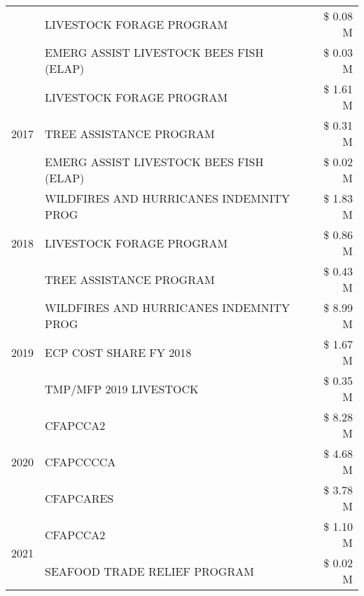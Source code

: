 \begin{tabular}{llr}
 & LIVESTOCK FORAGE PROGRAM                      & \$ 0.08 M \\
 & EMERG ASSIST LIVESTOCK BEES FISH (ELAP)       & \$ 0.03 M \\
\cline{1-3}
\multirow[t]{3}{*}{2017} & LIVESTOCK FORAGE PROGRAM & \$ 1.61 M \\
 & TREE ASSISTANCE PROGRAM & \$ 0.31 M \\
 & EMERG ASSIST LIVESTOCK BEES FISH (ELAP) & \$ 0.02 M \\
\cline{1-3}
\multirow[t]{3}{*}{2018} & WILDFIRES AND HURRICANES INDEMNITY PROG & \$ 1.83 M \\
 & LIVESTOCK FORAGE PROGRAM & \$ 0.86 M \\
 & TREE ASSISTANCE PROGRAM & \$ 0.43 M \\
\cline{1-3}
\multirow[t]{3}{*}{2019} & WILDFIRES AND HURRICANES INDEMNITY PROG & \$ 8.99 M \\
 & ECP COST SHARE FY 2018 & \$ 1.67 M \\
 & TMP/MFP 2019 LIVESTOCK & \$ 0.35 M \\
\cline{1-3}
\multirow[t]{3}{*}{2020} & CFAPCCA2 & \$ 8.28 M \\
 & CFAPCCCCA & \$ 4.68 M \\
 & CFAPCARES & \$ 3.78 M \\
\cline{1-3}
\multirow[t]{2}{*}{2021} & CFAPCCA2 & \$ 1.10 M \\
 & SEAFOOD TRADE RELIEF PROGRAM & \$ 0.02 M \\
\cline{1-3}
\bottomrule
\end{tabular}
